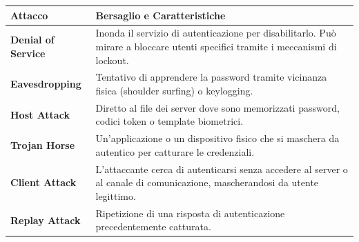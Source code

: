 \documentclass{article}
\begin{document}
\begin{table}[h!]
    \centering
    \renewcommand{\arraystretch}{1.5}
    \begin{tabularx}{\textwidth}{|l|X|}
        \hline
        \textbf{Attacco} & \textbf{Bersaglio e Caratteristiche} \\ \hline
        \textbf{Denial of Service} & Inonda il servizio di autenticazione per disabilitarlo. Può mirare a bloccare utenti specifici tramite i meccanismi di lockout. \\ \hline
        \textbf{Eavesdropping} & Tentativo di apprendere la password tramite vicinanza fisica (shoulder surfing) o keylogging. \\ \hline
        \textbf{Host Attack} & Diretto al file dei server dove sono memorizzati password, codici token o template biometrici. \\ \hline
        \textbf{Trojan Horse} & Un'applicazione o un dispositivo fisico che si maschera da autentico per catturare le credenziali. \\ \hline
        \textbf{Client Attack} & L'attaccante cerca di autenticarsi senza accedere al server o al canale di comunicazione, mascherandosi da utente legittimo. \\ \hline
        \textbf{Replay Attack} & Ripetizione di una risposta di autenticazione precedentemente catturata. \\ \hline
    \end{tabularx}
\end{table}
\end{document}
